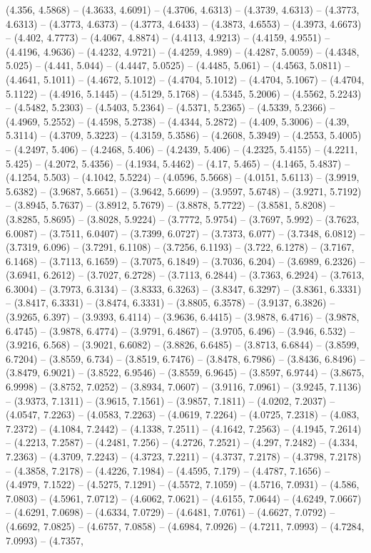 (4.356, 4.5868) -- (4.3633, 4.6091) -- (4.3706, 4.6313) -- (4.3739, 4.6313) -- (4.3773, 4.6313) -- (4.3773, 4.6373) -- (4.3773, 4.6433) -- (4.3873, 4.6553) -- (4.3973, 4.6673) -- (4.402, 4.7773) -- (4.4067, 4.8874) -- (4.4113, 4.9213) -- (4.4159, 4.9551) -- (4.4196, 4.9636) -- (4.4232, 4.9721) -- (4.4259, 4.989) -- (4.4287, 5.0059) -- (4.4348, 5.025) -- (4.441, 5.044) -- (4.4447, 5.0525) -- (4.4485, 5.061) -- (4.4563, 5.0811) -- (4.4641, 5.1011) -- (4.4672, 5.1012) -- (4.4704, 5.1012) -- (4.4704, 5.1067) -- (4.4704, 5.1122) -- (4.4916, 5.1445) -- (4.5129, 5.1768) -- (4.5345, 5.2006) -- (4.5562, 5.2243) -- (4.5482, 5.2303) -- (4.5403, 5.2364) -- (4.5371, 5.2365) -- (4.5339, 5.2366) -- (4.4969, 5.2552) -- (4.4598, 5.2738) -- (4.4344, 5.2872) -- (4.409, 5.3006) -- (4.39, 5.3114) -- (4.3709, 5.3223) -- (4.3159, 5.3586) -- (4.2608, 5.3949) -- (4.2553, 5.4005) -- (4.2497, 5.406) -- (4.2468, 5.406) -- (4.2439, 5.406) -- (4.2325, 5.4155) -- (4.2211, 5.425) -- (4.2072, 5.4356) -- (4.1934, 5.4462) -- (4.17, 5.465) -- (4.1465, 5.4837) -- (4.1254, 5.503) -- (4.1042, 5.5224) -- (4.0596, 5.5668) -- (4.0151, 5.6113) -- (3.9919, 5.6382) -- (3.9687, 5.6651) -- (3.9642, 5.6699) -- (3.9597, 5.6748) -- (3.9271, 5.7192) -- (3.8945, 5.7637) -- (3.8912, 5.7679) -- (3.8878, 5.7722) -- (3.8581, 5.8208) -- (3.8285, 5.8695) -- (3.8028, 5.9224) -- (3.7772, 5.9754) -- (3.7697, 5.992) -- (3.7623, 6.0087) -- (3.7511, 6.0407) -- (3.7399, 6.0727) -- (3.7373, 6.077) -- (3.7348, 6.0812) -- (3.7319, 6.096) -- (3.7291, 6.1108) -- (3.7256, 6.1193) -- (3.722, 6.1278) -- (3.7167, 6.1468) -- (3.7113, 6.1659) -- (3.7075, 6.1849) -- (3.7036, 6.204) -- (3.6989, 6.2326) -- (3.6941, 6.2612) -- (3.7027, 6.2728) -- (3.7113, 6.2844) -- (3.7363, 6.2924) -- (3.7613, 6.3004) -- (3.7973, 6.3134) -- (3.8333, 6.3263) -- (3.8347, 6.3297) -- (3.8361, 6.3331) -- (3.8417, 6.3331) -- (3.8474, 6.3331) -- (3.8805, 6.3578) -- (3.9137, 6.3826) -- (3.9265, 6.397) -- (3.9393, 6.4114) -- (3.9636, 6.4415) -- (3.9878, 6.4716) -- (3.9878, 6.4745) -- (3.9878, 6.4774) -- (3.9791, 6.4867) -- (3.9705, 6.496) -- (3.946, 6.532) -- (3.9216, 6.568) -- (3.9021, 6.6082) -- (3.8826, 6.6485) -- (3.8713, 6.6844) -- (3.8599, 6.7204) -- (3.8559, 6.734) -- (3.8519, 6.7476) -- (3.8478, 6.7986) -- (3.8436, 6.8496) -- (3.8479, 6.9021) -- (3.8522, 6.9546) -- (3.8559, 6.9645) -- (3.8597, 6.9744) -- (3.8675, 6.9998) -- (3.8752, 7.0252) -- (3.8934, 7.0607) -- (3.9116, 7.0961) -- (3.9245, 7.1136) -- (3.9373, 7.1311) -- (3.9615, 7.1561) -- (3.9857, 7.1811) -- (4.0202, 7.2037) -- (4.0547, 7.2263) -- (4.0583, 7.2263) -- (4.0619, 7.2264) -- (4.0725, 7.2318) -- (4.083, 7.2372) -- (4.1084, 7.2442) -- (4.1338, 7.2511) -- (4.1642, 7.2563) -- (4.1945, 7.2614) -- (4.2213, 7.2587) -- (4.2481, 7.256) -- (4.2726, 7.2521) -- (4.297, 7.2482) -- (4.334, 7.2363) -- (4.3709, 7.2243) -- (4.3723, 7.2211) -- (4.3737, 7.2178) -- (4.3798, 7.2178) -- (4.3858, 7.2178) -- (4.4226, 7.1984) -- (4.4595, 7.179) -- (4.4787, 7.1656) -- (4.4979, 7.1522) -- (4.5275, 7.1291) -- (4.5572, 7.1059) -- (4.5716, 7.0931) -- (4.586, 7.0803) -- (4.5961, 7.0712) -- (4.6062, 7.0621) -- (4.6155, 7.0644) -- (4.6249, 7.0667) -- (4.6291, 7.0698) -- (4.6334, 7.0729) -- (4.6481, 7.0761) -- (4.6627, 7.0792) -- (4.6692, 7.0825) -- (4.6757, 7.0858) -- (4.6984, 7.0926) -- (4.7211, 7.0993) -- (4.7284, 7.0993) -- (4.7357, 